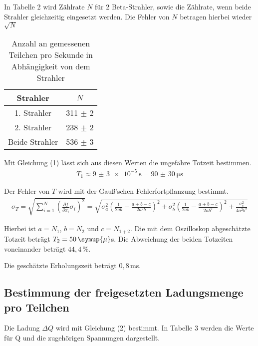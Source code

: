 In Tabelle 2 wird Zählrate $N$ für 2 Beta-Strahler, sowie die Zählrate, wenn beide Strahler gleichzeitig
eingesetzt werden. Die Fehler von $N$ betragen hierbei wieder $\sqrt{N}$

\begin{table}[H]
  \centering
  \caption{Anzahl an gemessenen Teilchen pro Sekunde in Abhängigkeit von dem Strahler}
  \label{tab:Rechteckspannung}
  \begin{tabular}{c c}
    \toprule
    Strahler & $N$  \\
    \midrule
    1. Strahler & 311 $\pm$ 2 \\
    2. Strahler & 238 $\pm$ 2\\
    Beide Strahler & 536 $\pm$ 3\\
    \bottomrule
  \end{tabular}
\end{table}

Mit Gleichung (1) lässt sich aus diesen Werten die ungefähre Totzeit bestimmen.
\begin{align*}
  T_1 \approx \SI{9(3)e-5}{\second} = \SI{90(30)}{\micro\second}
\end{align*}

Der Fehler von $T$ wird mit der Gauß'schen Fehlerfortpflanzung bestimmt.
\begin{align*}
  \sigma_T = \sqrt{
      \sum\limits_{i = 1}^N
       \left( \frac{\partial f}{\partial x_i} \sigma_i \right)^{\!\! 2}
     }
    = \sqrt{\sigma_{a}^{2} \left(\frac{1}{2 a b} - \frac{a + b - c}{2 a^{2} b}\right)^{2}
  + \sigma_{b}^{2} \left(\frac{1}{2 a b} - \frac{a + b - c}{2 a b^{2}}\right)^{2} + \frac{\sigma_{c}^{2}}{4 a^{2} b^{2}}}
\end{align*}

Hierbei ist $a=N_1$, $b=N_2$ und $c=N_{1+2}$.
Die mit dem Oszilloskop abgeschätzte Totzeit beträgt $T_2 = 50 \, \symup{\mu} $s.
Die Abweichung der beiden Totzeiten voneinander beträgt $44,4 \, \%$.

Die geschätzte Erholungszeit beträgt $0,8 \,$ms.


\subsection{Bestimmung der freigesetzten Ladungsmenge pro Teilchen}

Die Ladung $\Delta Q$ wird mit Gleichung (2) bestimmt. In Tabelle 3 werden die Werte für Q und die zugehörigen Spannungen dargestellt.

